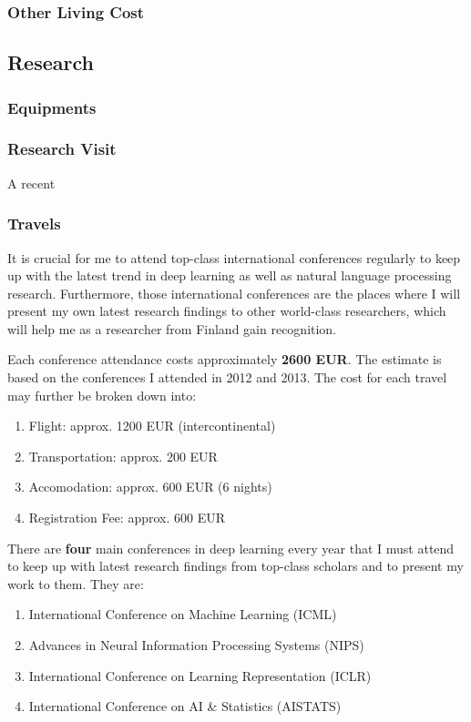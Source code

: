 \documentclass[11pt, oneside]{essay}
\begin{document}
\subsubsection{Other Living Cost}



\subsection{Research}

\subsubsection{Equipments}


\subsubsection{Research Visit}

A recent 



\subsubsection{Travels}

It is crucial for me to attend top-class international
conferences regularly to keep up with the latest trend in deep
learning as well as natural language processing research.
Furthermore, those international conferences are the places where
I will present my own latest research findings to other
world-class researchers, which will help me as a researcher from
Finland gain recognition.

Each conference attendance costs approximately \textbf{2600 EUR}.
The estimate is based on the conferences I attended in 2012 and
2013. The cost for each travel may further be broken down into:
\begin{enumerate}
    \item Flight: approx. 1200 EUR (intercontinental)
    \item Transportation: approx. 200 EUR
    \item Accomodation: approx. 600 EUR (6 nights)
    \item Registration Fee: approx. 600 EUR
\end{enumerate}

There are \textbf{four} main conferences in deep learning every
year that I must attend to keep up with latest research findings
from top-class scholars and to present my work to them. They are:
\begin{enumerate}
    \item International Conference on Machine Learning (ICML)
    \item Advances in Neural Information Processing Systems (NIPS)
    \item International Conference on Learning Representation (ICLR)
    \item International Conference on AI \& Statistics (AISTATS)
\end{enumerate}
\end{document}
